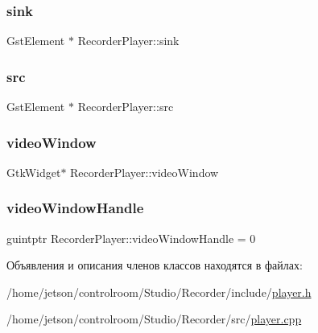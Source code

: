 \mbox{\label{class_recorder_player_a66c0560426b8ce256c4a1d5a930fbc5b}} 
\subsubsection{\texorpdfstring{sink}{sink}}
{\footnotesize\ttfamily Gst\+Element $\ast$ Recorder\+Player\+::sink}

\mbox{\label{class_recorder_player_a9d7939305cd8972f5c14ba3faff82488}} 
\subsubsection{\texorpdfstring{src}{src}}
{\footnotesize\ttfamily Gst\+Element $\ast$ Recorder\+Player\+::src}

\mbox{\label{class_recorder_player_a88e14542c46c550d3366ce20c047dcef}} 
\subsubsection{\texorpdfstring{video\+Window}{videoWindow}}
{\footnotesize\ttfamily Gtk\+Widget$\ast$ Recorder\+Player\+::video\+Window\hspace{0.3cm}{\ttfamily [private]}}

\mbox{\label{class_recorder_player_a2c788aa6e0c30a8333198f859ce21955}} 
\subsubsection{\texorpdfstring{video\+Window\+Handle}{videoWindowHandle}}
{\footnotesize\ttfamily guintptr Recorder\+Player\+::video\+Window\+Handle = 0\hspace{0.3cm}{\ttfamily [private]}}



Объявления и описания членов классов находятся в файлах\+:\begin{DoxyCompactItemize}
\item 
/home/jetson/controlroom/\+Studio/\+Recorder/include/\hyperlink{_recorder_2include_2player_8h}{player.\+h}\item 
/home/jetson/controlroom/\+Studio/\+Recorder/src/\hyperlink{_recorder_2src_2player_8cpp}{player.\+cpp}\end{DoxyCompactItemize}
